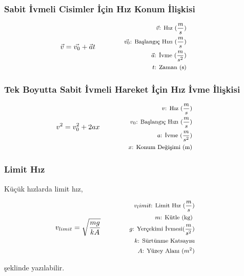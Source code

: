 \subsubsection*{Sabit İvmeli Cisimler İçin Hız Konum İlişkisi}
\begin{equation}
    \vec{v} = \vec{v_0} + \vec{a}t \qquad \qquad \parbox{4cm}{\footnotesize$\begin{aligned}
        \vec{v}\text{: Hız } (\frac{m}{s}) \\
        \vec{v_0}\text{: Başlangıç Hızı } (\frac{m}{s}) \\
        \vec{a}\text{: İvme } (\frac{m}{s^2}) \\
        t\text{: Zaman (s)}
\end{aligned}$}
\end{equation}

\subsubsection*{Tek Boyutta Sabit İvmeli Hareket İçin Hız İvme İlişkisi}
\begin{equation}
    v^2 = v_0 ^2 + 2ax \qquad \qquad \parbox{4cm}{\footnotesize$\begin{aligned}
        v\text{: Hız } (\frac{m}{s}) \\
        v_0\text{: Başlangıç Hızı } (\frac{m}{s}) \\
        a\text{: İvme } (\frac{m}{s^2}) \\
        x\text{: Konum Değişimi (m)}
\end{aligned}$}
\end{equation}

\subsubsection*{Limit Hız}

Küçük hızlarda limit hız,

\begin{equation}
    v_{limit} = \sqrt{\frac{mg}{kA}} \qquad \qquad \parbox{4cm}{\footnotesize$\begin{aligned}
        v_limit\text{: Limit Hız } (\frac{m}{s}) \\
        m\text{: Kütle (kg) } \\
        g\text{: Yerçekimi İvmesi} (\frac{m}{s^2}) \\
        k\text{: Sürtünme Katsayısı} \\
        A\text{: Yüzey Alanı } (m^2)
\end{aligned}$}
\end{equation}

şeklinde yazılabilir.
